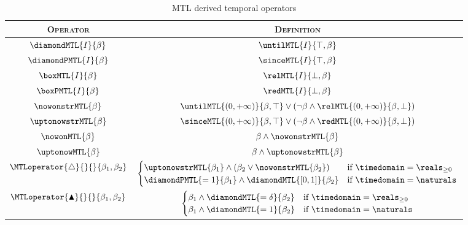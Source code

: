 \documentclass[a4paper]{article}
\newcommand{\logictrue}{\top}
\newcommand{\logicfalse}{\bot}
\newcommand{\becomesMTL}[1]{\MTLoperator{\triangle}{}{}{#1}}
\newcommand{\becomesOMTL}[1]{\MTLoperator{\blacktriangle}{}{}{#1}}
\theoremstyle{plain}
\theoremstyle{definition}
\begin{document}
\begin{table}[htb]
\begin{center}
  \begin{tabular}{|c @{$\quad \equiv \quad$} c|}
	 \hline
    \textsc{Operator}        & \textsc{Definition}  \\
    \hline
	 $\diamondMTL{I}{\beta}$    &   $\untilMTL{I}{\logictrue, \beta}$  \\
	 $\diamondPMTL{I}{\beta}$    &   $\sinceMTL{I}{\logictrue, \beta}$ \\
	 $\boxMTL{I}{\beta}$    &   $\relMTL{I}{\logicfalse, \beta}$ \\
	 $\boxPMTL{I}{\beta}$    &   $\redMTL{I}{\logicfalse, \beta}$ \\
    $\nowonstrMTL{\beta}$     &    $\untilMTL{(0, +\infty)}{\beta, \logictrue} \vee (\neg \beta \wedge \relMTL{(0, +\infty)}{\beta, \logicfalse})$  \\
    $\uptonowstrMTL{\beta}$     &    $\sinceMTL{(0, +\infty)}{\beta, \logictrue} \vee (\neg \beta \wedge \redMTL{(0, +\infty)}{\beta, \logicfalse})$ \\
	 $\nowonMTL{\beta}$  &  $\beta \wedge \nowonstrMTL{\beta}$ \\
	 $\uptonowMTL{\beta}$  &  $\beta \wedge \uptonowstrMTL{\beta}$ \\
	 $\becomesMTL{\beta_1, \beta_2}$ &   $\begin{cases}
                       \uptonowstrMTL{\beta_1} \wedge \left( \beta_2 \vee \nowonstrMTL{\beta_2} \right)   &
                                   \text{if } \timedomain = \reals_{\geq 0} \\
							  \diamondPMTL{=1}{\beta_1} \wedge \diamondMTL{[0,1]}{\beta_2}    &
                                   \text{if } \timedomain = \naturals
                                         \end{cases}$ \\
	 $\becomesOMTL{\beta_1, \beta_2}$  &  $\begin{cases}
		                 \beta_1 \wedge \diamondMTL{=\delta}{\beta_2} &
                                   \text{if } \timedomain = \reals_{\geq 0} \\
							  \beta_1 \wedge \diamondMTL{=1}{\beta_2}    &
                                   \text{if } \timedomain = \naturals
                                          \end{cases}$ \\
   \hline
  \end{tabular}
  \caption{MTL derived temporal operators}
  \label{tab:mtl-derived}
\end{center}
\end{table}
\end{document}
